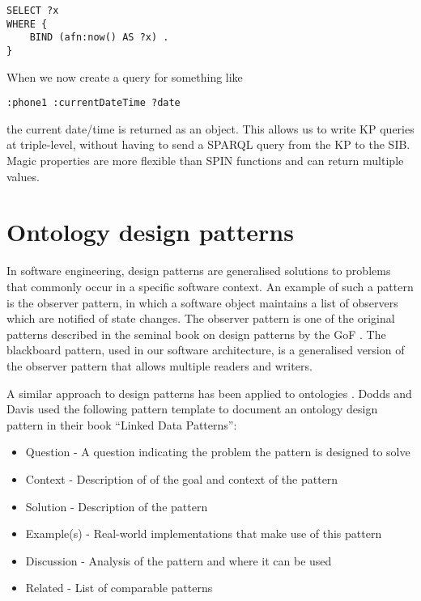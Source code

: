 
\begin{verbatim}
SELECT ?x
WHERE {
    BIND (afn:now() AS ?x) .
}
\end{verbatim}

When we now create a query for something like 

\begin{verbatim}
:phone1 :currentDateTime ?date
\end{verbatim}

the current date/time is returned as an object. This allows us to write \ac{KP} queries at triple-level, without having to send a \ac{SPARQL} query from the \ac{KP} to the \ac{SIB}. Magic properties are more flexible than \ac{SPIN} functions and can return multiple values.




\section{Ontology design patterns}\label{DesignPatterns}

In software engineering, design patterns are generalised solutions to problems that commonly occur in a specific software context. An example of such a pattern is the observer pattern, in which a software object maintains a list of observers which are notified of state changes. The observer pattern is one of the original patterns described in the seminal book on design patterns by the \ac{GoF} \cite{Gamma1994}.  The blackboard pattern, used in our software architecture, is a generalised version of the observer pattern that allows multiple readers and writers. 

A similar approach to design patterns has been applied to ontologies \cite{Gangemi2008, Hoekstra2009, Dodds2011}. Dodds and Davis \cite{Dodds2011} used the following pattern template to document an ontology design pattern in their book ``Linked Data Patterns'':

\begin{itemize}
	\item Question - A question indicating the problem the pattern is designed to solve
	\item Context - Description of of the goal and context of the pattern
	\item Solution - Description of the pattern
	\item Example(s) - Real-world implementations that make use of this pattern
	\item Discussion - Analysis of the pattern and where it can be used
	\item Related - List of comparable patterns
\end{itemize}

